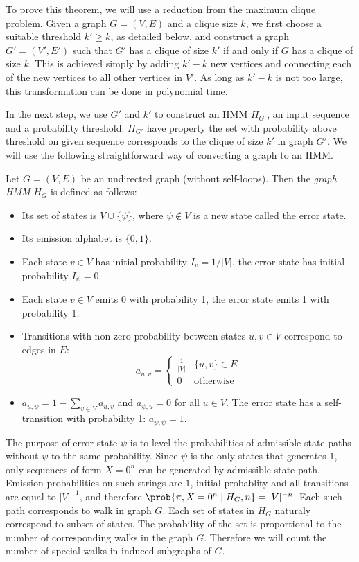 To prove this theorem, we will use a reduction from the maximum clique
problem.  Given a graph $G=(V,E)$ and a clique
size $k$, we first choose a suitable threshold $k'\ge k$, as
detailed below, and construct a graph $G'=(V',E')$ such that $G'$ has
a clique of size $k'$ if and only if $G$ has a clique of size
$k$. This is achieved simply by adding $k'-k$ new vertices and
connecting each of the new vertices to all other vertices in $V'$.
As long as $k'-k$ is not too large, this transformation can be done in
polynomial time.

In the next step, we use $G'$ and $k'$ to construct an HMM $H_{G'}$, an input
sequence and a probability threshold. $H_{G'}$ have property the set with
probability above threshold on given sequence corresponds to the clique of size
$k'$ in graph $G'$. We will use the following
straightforward way of converting a graph to an HMM.

\begin{definition}\label{GraphHMM}
Let $G=(V,E)$ be an undirected graph (without self-loops). 
Then the \emph{graph HMM} $H_G$ is defined as follows:
\begin{itemize}
\item Its set of states is $V\cup \{\psi\}$, where $\psi\notin V$ is a
  new state called the error state.
\item Its emission alphabet is $\{0,1\}$.
\item Each state $v\in V$ has initial probability $I_{v} = 1/|V|$, the
error state has initial probability $I_{\psi}=0$.
\item Each state $v\in V$ emits 0 with probability 1, the error state emits 1 
with probability 1.
\item Transitions with non-zero probability between states $u,v\in V$
  correspond to edges in $E$:
$$a_{u,v}=\begin{cases}
\frac1{|V|} & \{u,v\}\in E\\
0 & \text{otherwise}
\end{cases}$$
\item $a_{u,\psi}=1-\sum_{v\in V}a_{u,v}$
and $a_{\psi,u}=0$ for all $u\in V$. The error state has a self-transition with
probability 1: $a_{\psi,\psi}=1$.
\end{itemize}
\end{definition}

The purpose of error state $\psi$ is to level the probabilities of admissible
state paths without $\psi$ to the same probability. Since $\psi$ is the only
states that generates $1$, only sequences of form $X=0^n$ can be generated by
admissible state path. Emission probabilities on such strings are $1$, initial
probablity and all transitions are equal to $|V|^{-1}$, and therefore
$\prob{\pi, X=0^n\mid H_G,n} = |V|^{-n}$.  Each such path corresponds to walk in
graph $G$. Each set of states in $H_G$ naturaly correspond to subset of states.
The probability of the set is proportional to the number of corresponding walks
in the graph $G$. Therefore we will count the number of special walks in induced subgraphs of $G$.

